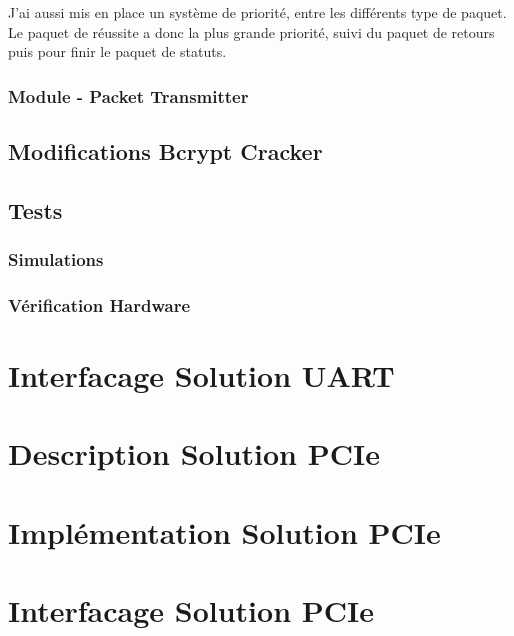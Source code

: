 J’ai aussi mis en place un système de priorité, entre les différents type de paquet. 
Le paquet de réussite a donc la plus grande priorité, suivi du paquet de retours puis pour finir le paquet de statuts.

\subsubsection{Module - Packet Transmitter}

\subsection{Modifications Bcrypt Cracker}

\subsection{Tests}
\subsubsection{Simulations}
\subsubsection{Vérification Hardware}

\section{Interfacage Solution UART}

\newpage

\section{Description Solution PCIe}
\section{Implémentation Solution PCIe}
\section{Interfacage Solution PCIe}
